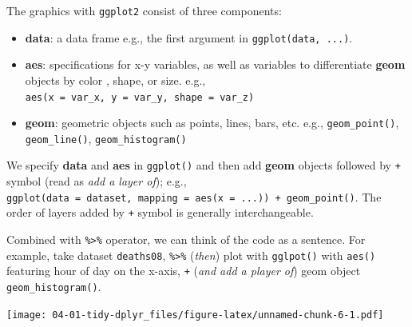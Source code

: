 \documentclass[]{book}
\newenvironment{Shaded}{\begin{snugshade}}{\end{snugshade}}
\newcommand{\KeywordTok}[1]{\textcolor[rgb]{0.13,0.29,0.53}{\textbf{{#1}}}}
\newcommand{\DataTypeTok}[1]{\textcolor[rgb]{0.13,0.29,0.53}{{#1}}}
\newcommand{\DecValTok}[1]{\textcolor[rgb]{0.00,0.00,0.81}{{#1}}}
\newcommand{\StringTok}[1]{\textcolor[rgb]{0.31,0.60,0.02}{{#1}}}
\newcommand{\CommentTok}[1]{\textcolor[rgb]{0.56,0.35,0.01}{\textit{{#1}}}}
\newcommand{\NormalTok}[1]{{#1}}
\theoremstyle{definition}
\theoremstyle{definition}
\theoremstyle{remark}
\begin{document}
The graphics with \texttt{ggplot2} consist of three components:

\begin{itemize}
\item
  \textbf{data}: a data frame e.g., the first argument in
  \texttt{ggplot(data,\ ...)}.
\item
  \textbf{aes}: specifications for x-y variables, as well as variables
  to differentiate \textbf{geom} objects by color , shape, or size.
  e.g., \texttt{aes(x\ =\ var\_x,\ y\ =\ var\_y,\ shape\ =\ var\_z)}
\item
  \textbf{geom}: geometric objects such as points, lines, bars, etc.
  e.g., \texttt{geom\_point()}, \texttt{geom\_line()},
  \texttt{geom\_histogram()}
\end{itemize}

We specify \textbf{data} and \textbf{aes} in \texttt{ggplot()} and then
add \textbf{geom} objects followed by \texttt{+} symbol (read as
\emph{add a layer of}); e.g.,
\texttt{ggplot(data\ =\ dataset,\ mapping\ =\ aes(x\ =\ ...))\ +\ geom\_point()}.
The order of layers added by \texttt{+} symbol is generally
interchangeable.

Combined with \texttt{\%\textgreater{}\%} operator, we can think of the
code as a sentence. For example, take dataset \texttt{deaths08},
\texttt{\%\textgreater{}\%} (\emph{then}) plot with \texttt{gglpot()}
with \texttt{aes()} featuring hour of day on the x-axis, \texttt{+}
(\emph{and add a player of}) geom object \texttt{geom\_histogram()}.

\begin{Shaded}
\end{Shaded}

\texttt{[image: 04-01-tidy-dplyr\_files/figure-latex/unnamed-chunk-6-1.pdf]}

\begin{Shaded}
\end{Shaded}
\end{document}
